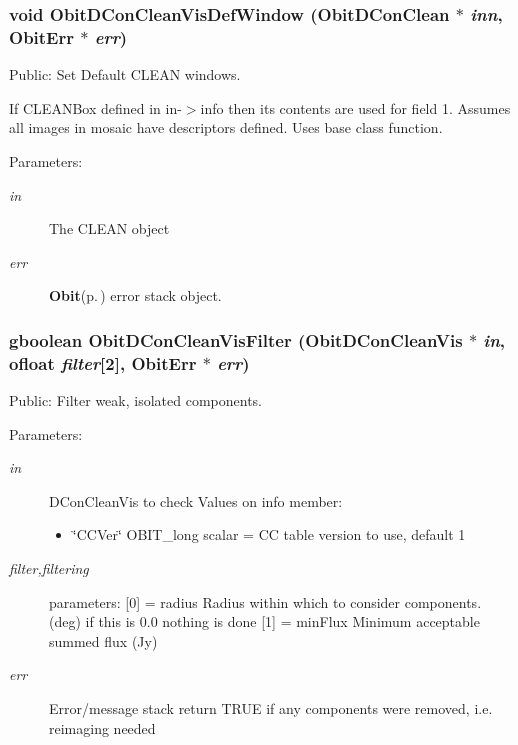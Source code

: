 \subsubsection{\setlength{\rightskip}{0pt plus 5cm}void Obit\-DCon\-Clean\-Vis\-Def\-Window ({\bf Obit\-DCon\-Clean} $\ast$ {\em inn}, {\bf Obit\-Err} $\ast$ {\em err})}\label{ObitDConCleanVis_8c_a20}


Public: Set Default CLEAN windows. 

If CLEANBox defined in in-$>$info then its contents are used for field 1. Assumes all images in mosaic have descriptors defined. Uses base class function. \begin{Desc}
\item[Parameters:]
\begin{description}
\item[{\em in}]The CLEAN object \item[{\em err}]{\bf Obit}{\rm (p.\,\pageref{structObit})} error stack object. \end{description}
\end{Desc}
\subsubsection{\setlength{\rightskip}{0pt plus 5cm}gboolean Obit\-DCon\-Clean\-Vis\-Filter ({\bf Obit\-DCon\-Clean\-Vis} $\ast$ {\em in}, {\bf ofloat} {\em filter}[2], {\bf Obit\-Err} $\ast$ {\em err})}\label{ObitDConCleanVis_8c_a27}


Public: Filter weak, isolated components. 

\begin{Desc}
\item[Parameters:]
\begin{description}
\item[{\em in}]DCon\-Clean\-Vis to check Values on info member: \begin{itemize}
\item \char`\"{}CCVer\char`\"{} OBIT\_\-long scalar = CC table version to use, default 1 \end{itemize}
\item[{\em filter,filtering}]parameters: [0] = radius Radius within which to consider components. (deg) if this is 0.0 nothing is done [1] = min\-Flux Minimum acceptable summed flux (Jy) \item[{\em err}]Error/message stack return TRUE if any components were removed, i.e. reimaging needed \end{description}
\end{Desc}
